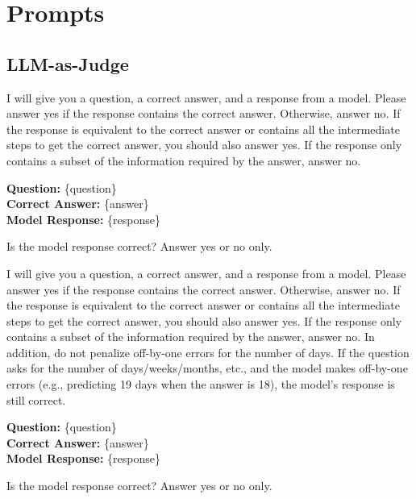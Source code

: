 \section{Prompts}

\subsection{LLM-as-Judge}
\label{prompts:LLM-as-Judge}

\begin{tcolorbox}[colback=gray!10,colframe=black,title=Standard Tasks (Single-session-user/assistant\, Multi-session)]
I will give you a question, a correct answer, and a response from a model. Please answer yes if the response contains the correct answer. Otherwise, answer no. If the response is equivalent to the correct answer or contains all the intermediate steps to get the correct answer, you should also answer yes. If the response only contains a subset of the information required by the answer, answer no.

\textbf{Question:} \{question\}\\
\textbf{Correct Answer:} \{answer\}\\
\textbf{Model Response:} \{response\}

Is the model response correct? Answer yes or no only.
\end{tcolorbox}

\begin{tcolorbox}[colback=gray!10,colframe=black,title=Temporal Reasoning Tasks]
I will give you a question, a correct answer, and a response from a model. Please answer yes if the response contains the correct answer. Otherwise, answer no. If the response is equivalent to the correct answer or contains all the intermediate steps to get the correct answer, you should also answer yes. If the response only contains a subset of the information required by the answer, answer no. In addition, do not penalize off-by-one errors for the number of days. If the question asks for the number of days/weeks/months, etc., and the model makes off-by-one errors (e.g., predicting 19 days when the answer is 18), the model's response is still correct.

\textbf{Question:} \{question\}\\
\textbf{Correct Answer:} \{answer\}\\
\textbf{Model Response:} \{response\}

Is the model response correct? Answer yes or no only.
\end{tcolorbox}

